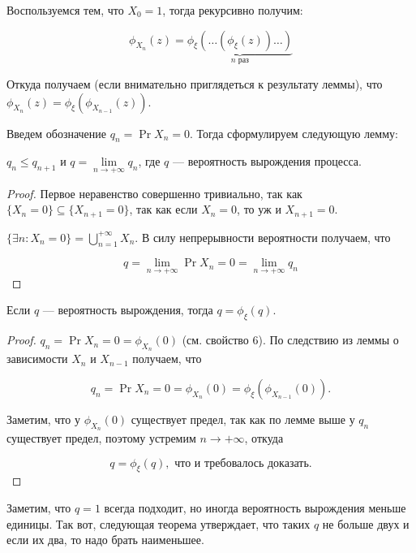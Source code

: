 \begin{consequence}
  Воспользуемся тем, что $X_0 = 1$, тогда рекурсивно получим:

  \[
    \phi_{X_n}(z) = \underbrace{\phi_{\xi}(\ldots(\phi_{\xi}(z))\ldots)}_{n \text{ раз}}
  \]

  Откуда получаем (если внимательно приглядеться к результату леммы),
  что $\phi_{X_n}(z) = \phi_{\xi}(\phi_{X_{n - 1}}(z))$.
\end{consequence}

Введем обозначение $q_n = \Pr{X_n = 0}$. Тогда сформулируем следующую лемму:

\begin{lemma}
  $q_n \leq q_{n + 1}$ и $q = \lim\limits_{n \to +\infty} q_n$, где $q$ --- вероятность
  вырождения процесса.
\end{lemma}

\begin{proof}
  Первое неравенство совершенно тривиально, так как $\{X_n = 0\} \subseteq 
  \{X_{n + 1} = 0\}$, так как если $X_n = 0$, то уж и $X_{n + 1} = 0$.

  $\{\exists n: X_n = 0\} = \bigcup\limits_{n = 1}^{+\infty} X_n$. В силу
  непрерывности вероятности получаем, что

  \[
    q = \lim\limits_{n \to +\infty} \Pr{X_n = 0} = \lim\limits_{n \to +\infty}
    q_n
  \]
\end{proof}

\begin{theorem}
  Если $q$ --- вероятность вырождения, тогда $q = \phi_{\xi}(q)$.
\end{theorem}

\begin{proof}
  $q_n = \Pr{X_n = 0} = \phi_{X_n}(0)$ (см. свойство 6). По следствию
  из леммы о зависимости $X_n$ и $X_{n - 1}$ получаем, что

  \[
    q_n = \Pr{X_n = 0} = \phi_{X_n}(0) = \phi_{\xi}(\phi_{X_{n - 1}}(0)).
  \]

  Заметим, что у $\phi_{X_n}(0)$ существует предел, так как по лемме выше у
  $q_n$ существует предел, поэтому устремим $n \to +\infty$, откуда

  \[
    q = \phi_{\xi}(q), \text{ что и требовалось доказать.}
  \]
\end{proof}

Заметим, что $q = 1$
всегда подходит, но иногда вероятность вырождения меньше единицы. Так вот, следующая
теорема утверждает, что таких $q$ не больше двух и если их два, то надо брать
наименьшее.


